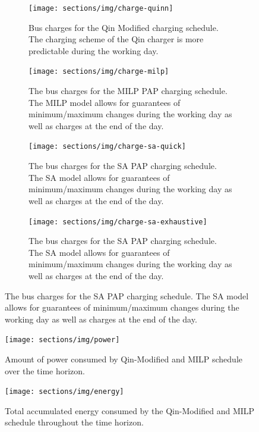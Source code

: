 \documentclass[11pt,a4paper,final]{article}
\begin{document}
\begin{figure}
  \begin{subfigure}[t]{\textwidth}
    \centering
    \texttt{[image: sections/img/charge-quinn]}
    \caption{Bus charges for the Qin Modified charging schedule. The charging scheme of the Qin charger is more predictable during the working day.}
    \label{subfig:qin-charge}
  \end{subfigure}
  \hfill
  \begin{subfigure}[t]{\textwidth}
    \centering
    \texttt{[image: sections/img/charge-milp]}
    \caption{The bus charges for the MILP PAP charging schedule. The MILP model allows for guarantees of minimum/maximum changes during the working day as well as charges at the end of the day.}
    \label{subfig:milp-charge}
  \end{subfigure}
  \hfill
  \begin{subfigure}[t]{\textwidth}
    \centering
    \texttt{[image: sections/img/charge-sa-quick]}
    \caption{The bus charges for the SA PAP charging schedule. The SA model allows for guarantees of minimum/maximum changes during the working day as well as charges at the end of the day.}
    \label{subfig:sa-charge}
  \end{subfigure}
  \hfill
  \begin{subfigure}[t]{\textwidth}
    \centering
    \texttt{[image: sections/img/charge-sa-exhaustive]}
    \caption{The bus charges for the SA PAP charging schedule. The SA model allows for guarantees of minimum/maximum changes during the working day as well as charges at the end of the day.}
    \label{subfig:sa-charge}
  \end{subfigure}
\end{figure}

\begin{figure}[htpb]
\centering
    \texttt{[image: sections/img/power]}
    \caption{Amount of power consumed by Qin-Modified and MILP schedule over the time horizon.}
    \label{fig:power-usage}
\end{figure}

\begin{figure}[htpb]
\centering \texttt{[image: sections/img/energy]}
    \caption{Total accumulated energy consumed by the Qin-Modified and MILP schedule throughout the time horizon.}
    \label{fig:energy-usage}
\end{figure}
\newpage




\end{document}

